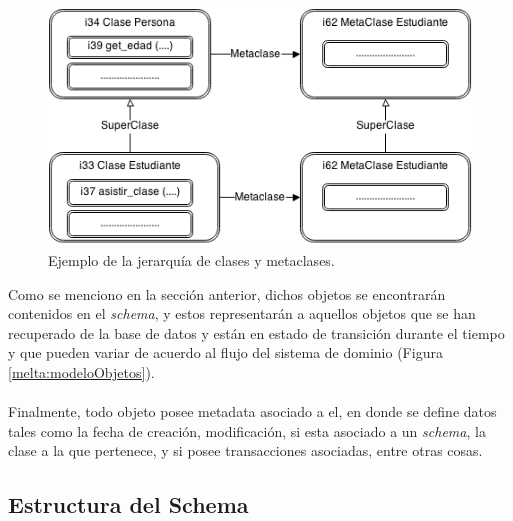 \documentclass{melta}
\begin{document}
\begin{figure}
\centering
\includegraphics[scale=0.5]{MeltaMetaclase}
\caption{Ejemplo de la jerarquía de clases y metaclases.}
\label{melta:Metaclase}
\end{figure}


Como se menciono en la sección anterior, dichos objetos se encontrarán contenidos en el \textit{schema}, y estos representarán a aquellos objetos que se han recuperado de la base de datos y están en estado de transición durante el tiempo y que pueden variar de acuerdo al flujo del sistema de dominio (Figura \ref{melta:modeloObjetos}).
\\\\
Finalmente, todo objeto posee metadata asociado a el, en donde se define datos tales como la fecha de creación, modificación, si esta asociado a un \textit{schema}, la clase a la que pertenece, y si posee transacciones asociadas, entre otras cosas.

\subsection{Estructura del Schema}
\end{document}
